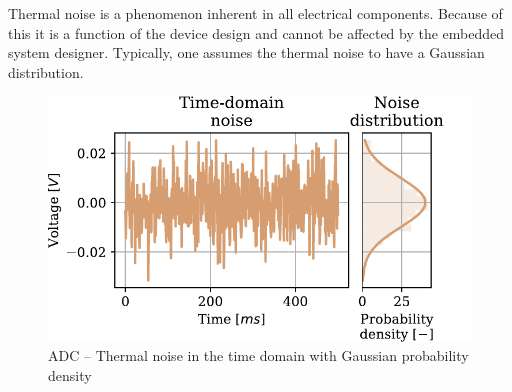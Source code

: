 Thermal noise is a phenomenon inherent in all electrical components. Because of this it is a function of the device design and cannot be affected by the embedded system designer. Typically, one assumes the thermal noise to have a Gaussian distribution.

\begin{figure}
    \centering
    \includegraphics[scale=0.72]{figures/electronics/adc/plot_thermerr}
    \caption[ADC thermal noise]{ADC -- Thermal noise in the time domain with Gaussian probability density \cite{hall2020fund}}
    \label{fig:plot_themerr}
\end{figure}

